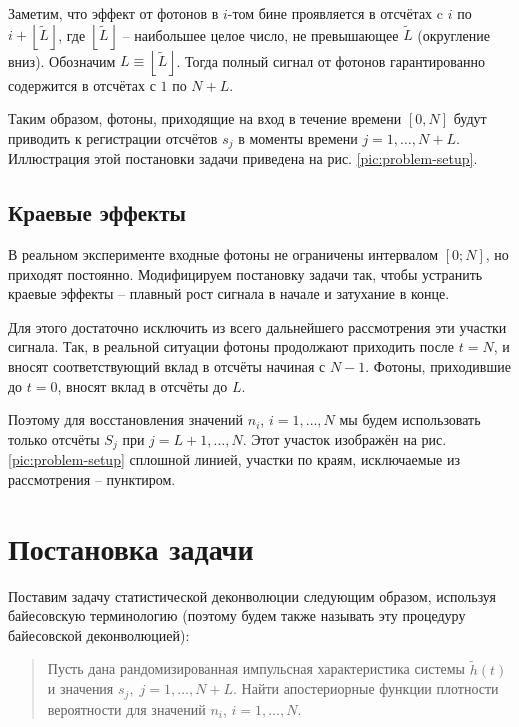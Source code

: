 \documentclass[12pt]{book}
\begin{document}
	Заметим, что эффект от фотонов в $i$-том бине проявляется в отсчётах c $i$ по $i + \left \lfloor{\tilde{L}}\right \rfloor$, где $\left \lfloor{\tilde{L}}\right \rfloor$ -- наибольшее целое число, не превышающее $\tilde{L}$ (округление вниз). Обозначим $L \equiv \left \lfloor{\tilde{L}}\right \rfloor$. Тогда полный сигнал от фотонов гарантированно содержится в отсчётах с $1$ по $N + L$.
	
	Таким образом, фотоны, приходящие на вход в течение времени $\left[0, N\right]$ будут приводить к регистрации отсчётов $s_j$ в моменты времени $j = 1, \ldots, N + L$. Иллюстрация этой постановки задачи приведена на рис. \ref{pic:problem-setup}.
	
	\subsection{Краевые эффекты} \label{sec:edge-effects}
	
	В реальном эксперименте входные фотоны не ограничены интервалом $[0; N]$, но приходят постоянно. Модифицируем постановку задачи так, чтобы устранить краевые эффекты -- плавный рост сигнала в начале и затухание в конце.
	
	Для этого достаточно исключить из всего дальнейшего рассмотрения эти участки сигнала. Так, в реальной ситуации фотоны продолжают приходить после $t=N$, и вносят соответствующий вклад в отсчёты начиная с $N-1$. Фотоны, приходившие до $t=0$, вносят вклад в отсчёты до $L$.
	
	Поэтому для восстановления значений $n_i$, $i = 1, \ldots, N$ мы будем использовать только отсчёты $S_j$ при $j = L+1, \ldots, N$. Этот участок изображён на рис. \ref{pic:problem-setup} сплошной линией, участки по краям, исключаемые из рассмотрения -- пунктиром.
	
	
	\section{Постановка задачи}
	
	Поставим задачу статистической деконволюции следующим образом, используя байесовскую терминологию (поэтому будем также называть эту процедуру байесовской деконволюцией):
	
	\begin{quote}
		Пусть дана рандомизированная импульсная характеристика системы $\tilde{h}(t)$ и значения $s_j, \; j = 1, \ldots, N + L$. Найти апостериорные функции плотности вероятности для значений $n_i$, $i = 1, \ldots, N$.
	\end{quote}
	
\end{document}

